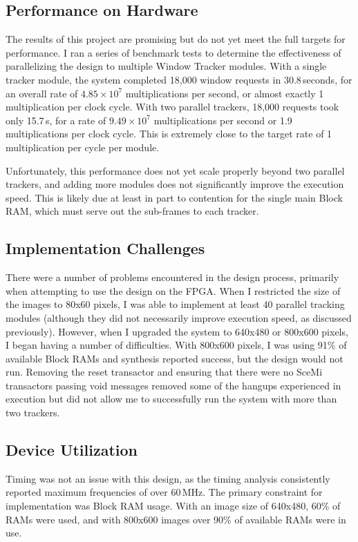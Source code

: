 \documentclass{article}
\begin{document}
\subsection{Performance on Hardware}
\label{sec:performance}
The results of this project are promising but do not yet meet the full targets for performance. I ran a series of benchmark tests to determine the effectiveness of parallelizing the design to multiple Window Tracker modules. With a single tracker module, the system completed 18,000 window requests in 30.8\,seconds, for an overall rate of $4.85 \times 10^7$ multiplications per second, or almost exactly 1 multiplication per clock cycle. With two parallel trackers, 18,000 requests took only 15.7\,s, for a rate of $9.49\times10^7$ multiplications per second or 1.9 multiplications per clock cycle. This is extremely close to the target rate of 1 multiplication per cycle per module. 

Unfortunately, this performance does not yet scale properly beyond two parallel trackers, and adding more modules does not significantly improve the execution speed. This is likely due at least in part to contention for the single main Block RAM, which must serve out the sub-frames to each tracker. 

\subsection{Implementation Challenges}
There were a number of problems encountered in the design process, primarily when attempting to use the design on the FPGA. When I restricted the size of the images to 80x60 pixels, I was able to implement at least 40 parallel tracking modules (although they did not necessarily improve execution speed, as discussed previously). However, when I upgraded the system to 640x480 or 800x600 pixels, I began having a number of difficulties. With 800x600 pixels, I was using 91\% of available Block RAMs and synthesis reported success, but the design would not run. Removing the reset transactor and ensuring that there were no SceMi transactors passing void messages removed some of the hangups experienced in execution but did not allow me to successfully run the system with more than two trackers. 

\subsection{Device Utilization}
Timing was not an issue with this design, as the timing analysis consistently reported maximum frequencies of over 60\,MHz. The primary constraint for implementation was Block RAM usage. With an image size of 640x480, 60\% of RAMs were used, and with 800x600 images over 90\% of available RAMs were in use. 
\end{document}

